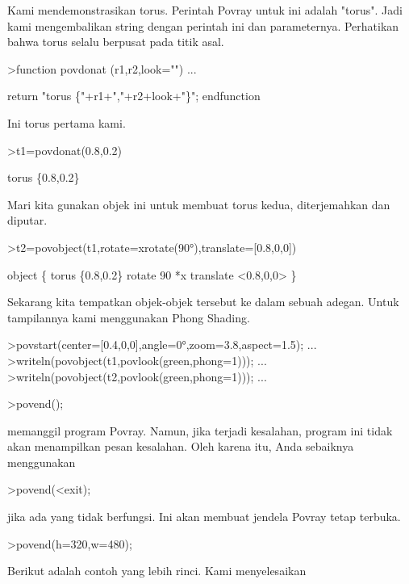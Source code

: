 \documentclass{article}
\begin{document}
\begin{eulernotebook}
\begin{eulercomment}
\begin{eulercomment}
\begin{eulercomment}
\begin{eulercomment}
\begin{eulercomment}
Kami mendemonstrasikan torus. Perintah Povray untuk ini adalah
"torus". Jadi kami mengembalikan string dengan perintah ini dan
parameternya. Perhatikan bahwa torus selalu berpusat pada titik asal.
\end{eulercomment}
\begin{eulerprompt}
>function povdonat (r1,r2,look="") ...
\end{eulerprompt}
\begin{eulerudf}
    return "torus \{"+r1+","+r2+look+"\}";
  endfunction
\end{eulerudf}
\begin{eulercomment}
Ini torus pertama kami.
\end{eulercomment}
\begin{eulerprompt}
>t1=povdonat(0.8,0.2)
\end{eulerprompt}
\begin{euleroutput}
  torus \{0.8,0.2\}
\end{euleroutput}
\begin{eulercomment}
Mari kita gunakan objek ini untuk membuat torus kedua, diterjemahkan
dan diputar.
\end{eulercomment}
\begin{eulerprompt}
>t2=povobject(t1,rotate=xrotate(90°),translate=[0.8,0,0])
\end{eulerprompt}
\begin{euleroutput}
  object \{ torus \{0.8,0.2\}
   rotate 90 *x 
   translate <0.8,0,0>
   \}
\end{euleroutput}
\begin{eulercomment}
Sekarang kita tempatkan objek-objek tersebut ke dalam sebuah adegan.
Untuk tampilannya kami menggunakan Phong Shading.
\end{eulercomment}
\begin{eulerprompt}
>povstart(center=[0.4,0,0],angle=0°,zoom=3.8,aspect=1.5); ...
>writeln(povobject(t1,povlook(green,phong=1))); ...
>writeln(povobject(t2,povlook(green,phong=1))); ...
\end{eulerprompt}
\begin{eulercomment}
\textgreater{}povend();

memanggil program Povray. Namun, jika terjadi kesalahan, program ini
tidak akan menampilkan pesan kesalahan. Oleh karena itu, Anda
sebaiknya menggunakan

\textgreater{}povend(\textless{}exit);

jika ada yang tidak berfungsi. Ini akan membuat jendela Povray tetap
terbuka.
\end{eulercomment}
\begin{eulerprompt}
>povend(h=320,w=480);
\end{eulerprompt}
\begin{eulercomment}
Berikut adalah contoh yang lebih rinci. Kami menyelesaikan


\end{eulercomment}
\end{eulercomment}
\end{eulercomment}
\end{eulercomment}
\end{eulercomment}
\end{eulernotebook}
\end{document}
